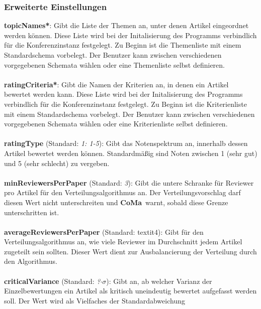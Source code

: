 \documentclass[headexclude,footexclude,12pt,BCOR0pt,DIV15]{scrartcl}
\newcommand{\CoMa}{\textbf{CoMa}}
\begin{document}
      \subsubsection{Erweiterte Einstellungen}
        \textbf{topicNames*}: Gibt die Liste der Themen an, unter denen Artikel eingeordnet werden k\"{o}nnen.
            Diese Liste wird bei der Initalisierung des Programms verbindlich f\"{u}r die Konferenzinstanz festgelegt.
            Zu Beginn ist die Themenliste mit einem Standardschema vorbelegt. Der Benutzer kann zwischen verschiedenen
            vorgegebenen Schemata w\"{a}hlen oder eine Themenliste selbst definieren.
        \\
        \\
        \textbf{ratingCriteria*}: Gibt die Namen der Kriterien an, in denen ein Artikel bewertet werden kann.
            Diese Liste wird bei der Initalisierung des Programms verbindlich f\"{u}r die Konferenzinstanz festgelegt.
            Zu Beginn ist die Kriterienliste mit einem Standardschema vorbelegt. Der Benutzer kann zwischen verschiedenen
            vorgegebenen Schemata w\"{a}hlen oder eine Kriterienliste selbst definieren.
        \\
        \\
        \textbf{ratingType} (Standard: \textit{1: 1-5}): Gibt das Notenspektrum an, innerhalb dessen Artikel bewertet werden k\"{o}nnen.
            Standardm\"{a}{\ss}ig sind Noten zwischen 1 (sehr gut) und 5 (sehr schlecht) zu vergeben.
        \\
        \\
        \textbf{minReviewersPerPaper} (Standard: \textit{3}): Gibt die untere Schranke f\"{u}r Reviewer pro Artikel f\"{u}r den
            Verteilungsalgorithmus an. Der Verteilungsvorschlag darf diesen Wert nicht unterschreiten und \CoMa\ warnt,
            sobald diese Grenze unterschritten ist.
        \\
        \\
        \textbf{averageReviewersPerPaper} (Standard: textit{4}): Gibt f\"{u}r den Verteilungsalgorithmus an, wie viele
            Reviewer im Durchschnitt jedem Artikel zugeteilt sein sollten. Dieser Wert dient zur Ausbalancierung der
            Verteilung durch den Algorithmus.
        \\
        \\
        \textbf{criticalVariance} (Standard: \textit{?$\cdot\sigma$}): Gibt an, ab welcher Varianz der Einzelbewertungen ein
            Artikel als kritisch uneindeutig bewertet aufgefasst werden soll. Der Wert wird als Vielfaches der Standardabweichung
\end{document}
